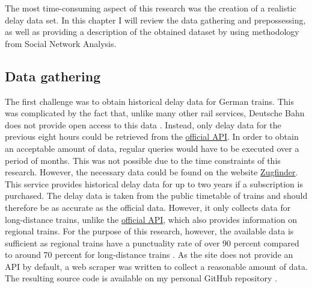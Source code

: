 \documentclass[12pt,a4paper]{article}
\begin{document}
The most time-consuming aspect of this research was the creation of a realistic delay data set. 
In this chapter I will review the data gathering and prepossessing, as well as providing a description of the obtained dataset by using methodology from Social Network Analysis.

\maketitle
\subsection{\label{sec:Gathering}Data gathering}

The first challenge was to obtain historical delay data for German trains. This was complicated by the fact that, unlike many other rail services, Deutsche Bahn does not provide open access to this data \citep[p.~5]{Spanninger2022}. 
Instead, only delay data for the previous eight hours could be retrieved from the \href{https://developers.deutschebahn.com/db-api-marketplace/apis/frontpage}{official API}. 
In order to obtain an acceptable amount of data, regular queries would have to be executed over a period of months. This was not possible due to the time constraints of this research. 
However, the necessary data could be found on the website \href{https://www.zugfinder.net/en/start}{Zugfinder}. This service provides historical delay data for up to two years if a subscription is purchased. 
The delay data is taken from the public timetable of trains and should therefore be as accurate as the official data. However, it only collects data for long-distance trains, unlike the \href{https://developers.deutschebahn.com/db-api-marketplace/apis/frontpage}{official API}, which also provides information on regional trains. 
For the purpose of this research, however, the available data is sufficient as regional trains have a punctuality rate of over 90 percent compared to around 70 percent for long-distance trains \citep{DBPunctuality2024}. 
As the site does not provide an API by default, a web scraper was written to collect a reasonable amount of data. The resulting source code is available on my personal GitHub repository \citep{repo}. 
\end{document}

